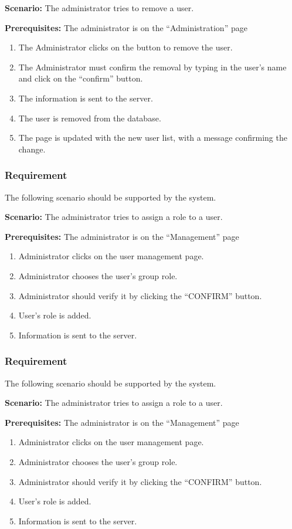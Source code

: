 \documentclass{article}
\begin{document}
\textbf{Scenario:} The administrator tries to remove a user.

\textbf{Prerequisites:} The administrator is on the “Administration” page

\begin{enumerate}
    \item The Administrator clicks on the button to remove the user.
    \item The Administrator must confirm the removal by typing in the user’s name and click on the “confirm” button.
    \item The information is sent to the server.
    \item The user is removed from the database.
    \item The page is updated with the new user list, with a message confirming the change.
\end{enumerate}

\subsubsection{Requirement}
The following scenario should be supported by the system.

\textbf{Scenario:} The administrator tries to assign a role to a user.

\textbf{Prerequisites:} The administrator is on the “Management” page

\begin{enumerate}
    \item Administrator clicks on the user management page.
    \item Administrator chooses the user’s group role.
    \item Administrator should verify it by clicking the “CONFIRM” button.
    \item User’s role is added.
    \item Information is sent to the server.
\end{enumerate}

\subsubsection{Requirement}
The following scenario should be supported by the system.

\textbf{Scenario:} The administrator tries to assign a role to a user.

\textbf{Prerequisites:} The administrator is on the “Management” page

\begin{enumerate}
    \item Administrator clicks on the user management page.
    \item Administrator chooses the user’s group role.
    \item Administrator should verify it by clicking the “CONFIRM” button.
    \item User’s role is added.
    \item Information is sent to the server.
\end{enumerate}
\end{document}
